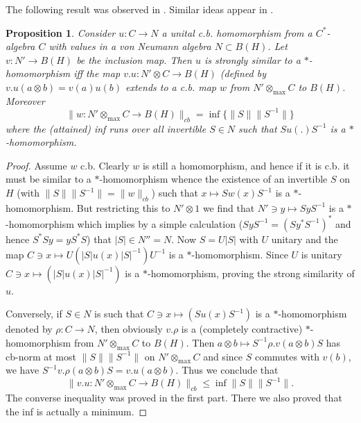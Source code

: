 \documentclass[11pt,leqno]{article}
\theoremstyle{plain}
\newtheorem{pro}[thm]{Proposition}
\theoremstyle{definition}
\theoremstyle{remark}
\numberwithin{equation}{section}
\begin{document}
      The following result   was observed in \cite[(2) p. 81]{toho}. Similar ideas appear
           in  \cite{fang}.
        
        \begin{pro} \label{p1}
        Consider $u: C \to N  $ a unital  c.b.  homomorphism from a $C^*$-algebra $C$
        with values in a von Neumann algebra  $N\subset B(H)$.
        Let $v: N' \to B(H)$ be the inclusion map.
        Then $u$ is strongly similar to a $*$-homomorphism
        iff the map $v . u : N' \otimes  C\to B(H) $ (defined by
        $v . u (a\otimes b)= v(a)u(b) $ extends to
        a c.b. map $w$ from $N' \otimes_{\max} C$ to $B(H)$.
        Moreover
         \begin{equation}  \label{e9}
         \| w:  N'\otimes_{\max} C \to B(H)\|_{cb} =\inf\{\|S\|\| S^{-1}  \| \}\end{equation}
        where the (attained) inf runs over all invertible  $S\in N$
        such that  $S u(.) S^{-1}$ is   a $*$-homomorphism.
\end{pro}
          \begin{proof}  Assume $w$ c.b. Clearly $w$ is still a homomorphism,
          and hence if it is c.b. it must be similar to a $*$-homomorphism
          whence the existence of an invertible $S$ on $H$ (with
          $\|S\|\| S^{-1}  \| =\|w\|_{cb} $)
          such that $x\mapsto S w(x) S^{-1} $ is a $*$-homomorphism.
          But restricting this to $N' \otimes 1$ we find that 
          $N' \ni y \mapsto  S y S^{-1}$ is  a $*$-homomorphism
          which implies by a simple calculation 
          ($S y S^{-1}   = (S y^* S^{-1})^* $ and hence $S^*S y=yS^*S$)
          that $|S| \in N''=N$.
          Now $S=U|S|$ with $U$ unitary and the map
          $C\ni x \mapsto  U (|S| u(x) |S|^{-1}) U^{-1}$
          is  a $*$-homomorphism.
          Since $U$ is unitary $C\ni x \mapsto    (|S| u(x) |S|^{-1})  $
           is  a $*$-homomorphism, proving the strong similarity of $u$.
           
           Conversely, if $S\in N$ is such that $C\ni x \mapsto    (S u(x) S^{-1})  $
           is  a $*$-homomorphism denoted by $\rho: C \to N$,
           then obviously $v.\rho $ is a (completely contractive)  
           $*$-homomorphism from $ N'\otimes_{\max} C$ to $B(H)$.
           Then  $a\otimes b \mapsto S^{-1} \rho.v (a\otimes b)   S $
           has cb-norm at most $\|S\|  \| S^{-1}  \|$ on $ N'\otimes_{\max} C$ and since $S$ commutes with $v(b)$, we have
           $S^{-1} v.\rho (a\otimes b)   S = v.u(a\otimes b) $. Thus we 
           conclude that $$\| v.u: N'  \otimes_{\max} C\to B(H)\|_{cb} \le \inf\|S\|  \| S^{-1}  \|.$$
           The converse inequality was proved in the first part. There we also proved that the inf is actually a minimum.
    \end{proof}
\end{document}
